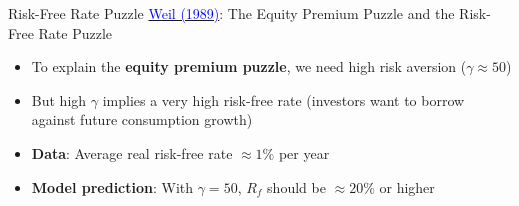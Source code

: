 \documentclass{beamer}
\begin{document}
\begin{frame}{Risk-Free Rate Puzzle}
	\href{https://doi.org/10.1016/0304-3932(89)90028-7}{\textcolor{blue}{Weil (1989)}}: The Equity Premium Puzzle and the Risk-Free Rate Puzzle
	\begin{itemize}
		\item To explain the \textbf{equity premium puzzle}, we need high risk aversion ($\gamma \approx 50$)
		\item But high $\gamma$ implies a \alert{very high} risk-free rate (investors want to borrow against future consumption growth)
		\item \textbf{Data}: Average real risk-free rate $\approx 1\%$ per year
		\item \textbf{Model prediction}: With $\gamma = 50$, $R_f$ should be $\approx 20\%$ or higher
	\end{itemize}
\end{frame}
\end{document}
